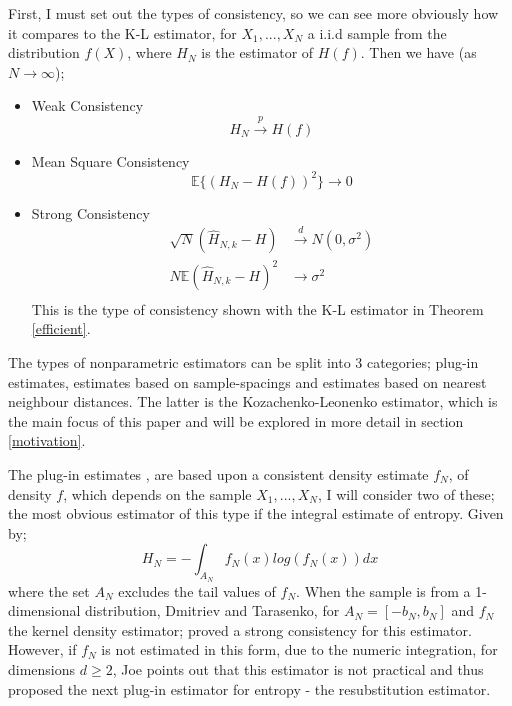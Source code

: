 \documentclass{article}
\begin{document}
First, I must set out the types of consistency, so we can see more obviously how it compares to the K-L estimator, for $X_{1}, ..., X_{N}$ a i.i.d sample from the distribution $f(X)$, where $H_{N}$ is the estimator of $H(f)$. Then we have (as $N \to \infty$);
\begin{itemize}
\item Weak Consistency 
\begin{equation}
H_{N} \xrightarrow{p} H(f)
\end{equation}

\item Mean Square Consistency
\begin{equation}
\mathbb{E}\{(H_{N} - H(f))^2\} \to 0
\end{equation}

\item Strong Consistency
\begin{align}
\sqrt{N}(\hat{H}_{N, k} - H) &\xrightarrow{d} N(0, \sigma^2) \\
N \mathbb{E}{(\hat{H}_{N, k} - H)^2} &\xrightarrow{} \sigma^2 \\ \nonumber
\end{align}
This is the type of consistency shown with the K-L estimator in Theorem \ref{efficient}.

\end{itemize}

The types of nonparametric estimators can be split into 3 categories; plug-in estimates, estimates based on sample-spacings and estimates based on nearest neighbour distances. The latter is the Kozachenko-Leonenko estimator, which is the main focus of this paper and will be explored in more detail in section \ref{motivation}.

The plug-in estimates \cite{paper10}, \cite{paper7} are based upon a consistent density estimate $f_{N}$, of density $f$, which depends on the sample $X_{1}, ..., X_{N}$, I will consider two of these; the most obvious estimator of this type if the integral estimate of entropy. Given by;
\begin{equation}
H_{N} = - \int_{A_{N}} f_{N}(x) log ( f_{N}(x) )dx
\end{equation}
where the set $A_{N}$ excludes the tail values of $f_{N}$. When the sample is from a 1-dimensional distribution, Dmitriev and Tarasenko, \cite{intest1} for $A_{N} = [-b_{N}, b_{N}]$ and $f_{N}$ the kernel density estimator; proved a strong consistency for this estimator. However, if $f_{N}$ is not estimated in this form, due to the numeric integration, for dimensions $d \geq 2$, Joe \cite{intest2} points out that this estimator is not practical and thus proposed the next plug-in estimator for entropy - the resubstitution estimator.
\end{document}
